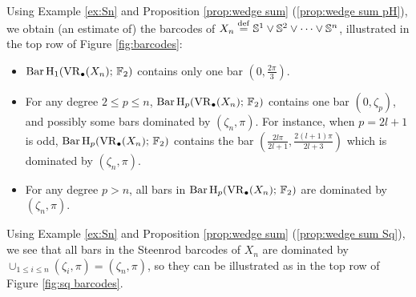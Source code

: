 \begin{example}
Using Example \ref{ex:Sn} and Proposition \ref{prop:wedge sum} (\ref{prop:wedge sum pH}), we obtain (an estimate of) the barcodes of $X_n\stackrel{\mathrm{def}}{=} \mathbb{S}^1\vee\mathbb{S}^2\vee\dots\vee\mathbb{S}^n$, illustrated in the top row of Figure \ref{fig:barcodes}:
\begin{itemize}
    \item $\operatorname{Bar} \operatorname{H}_{1}(\operatorname{VR}_\bullet(X_n);\,{\mathbb{F}_2})$ contains only one bar $\left(0,\frac{2\pi}{3}\right)$. 
    \item For any degree $2\leq p\leq n$, $\operatorname{Bar} \operatorname{H}_{p}(\operatorname{VR}_\bullet(X_n);\,{\mathbb{F}_2})$ contains one bar $(0,\zeta_p)$, and possibly some bars dominated by $(\zeta_n,\pi)$. For instance, when $p=2l+1$ is odd, $\operatorname{Bar} \operatorname{H}_{p}(\operatorname{VR}_\bullet(X_n);\,{\mathbb{F}_2})$ contains the bar $( \frac{2l\pi}{2l+1},\frac{2(l+1)\pi}{2l+3})$ which is dominated by $(\zeta_n,\pi)$.  
    \item For any degree $p>n$, all bars in $\operatorname{Bar} \operatorname{H}_{p}(\operatorname{VR}_\bullet(X_n);\,{\mathbb{F}_2})$ are dominated by $(\zeta_n,\pi)$.
\end{itemize}

Using Example \ref{ex:Sn} and Proposition \ref{prop:wedge sum} (\ref{prop:wedge sum Sq}), we see that all bars in the Steenrod barcodes of $X_n$ are dominated by $\cup_{1\leq i\leq n}(\zeta_i,\pi)=(\zeta_n,\pi)$, so they can be illustrated as in the top row of Figure \ref{fig:sq barcodes}.


\end{example}
